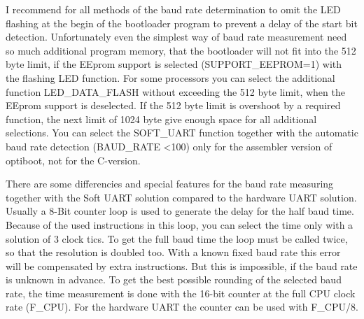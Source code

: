 I recommend for all methods of the baud rate determination to omit
the LED flashing at the begin of the bootloader program
to prevent a delay of the start bit detection.
Unfortunately even the simplest way of baud rate measurement
need so much additional program memory, that the bootloader
will not fit into the 512 byte limit, if the EEprom support
is selected (SUPPORT\_EEPROM=1) with the flashing LED function.
For some processors you can select the additional function LED\_DATA\_FLASH
without exceeding the 512 byte limit, when the EEprom support is deselected.
If the 512 byte limit is overshoot by a required function,
the next limit of 1024 byte give enough space for all additional
selections.
You can select the SOFT\_UART function together with the automatic
baud rate detection (BAUD\_RATE \textless 100) only for the
assembler version of optiboot, not for the C-version.

There are some differencies and special features for the baud rate measuring
together with the Soft UART solution compared to the hardware UART solution.
Usually a 8-Bit counter loop is used to generate the delay for the half baud time.
Because of the used instructions in this loop, you can select the time
only with a solution of 3 clock tics.
To get the full baud time the loop must be called twice, so that
the resolution is doubled too.
With a known fixed baud rate this error will be compensated by extra instructions.
But this is impossible, if the baud rate  is unknown in advance.
To get the best possible rounding of the selected baud rate,
the time measurement is done with the 16-bit counter at the full CPU clock rate (F\_CPU).
For the hardware UART the counter can be used with F\_CPU/8.

